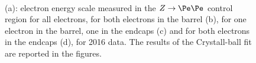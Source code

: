 \begin{figure}[!htb]
\begin{center}
 \\
\end{center}
\caption{
(a): electron energy scale measured in the $Z\rightarrow \Pe \Pe$ control region for all electrons, for both electrons in the barrel (b), for one electron in the barrel, one in the endcaps (c) and for both electrons in the endcaps (d), for 2016 data.
The results of the Crystall-ball fit are reported in the figures.
}
\label{fig:ele_energy_scaleA}
\end{figure}

